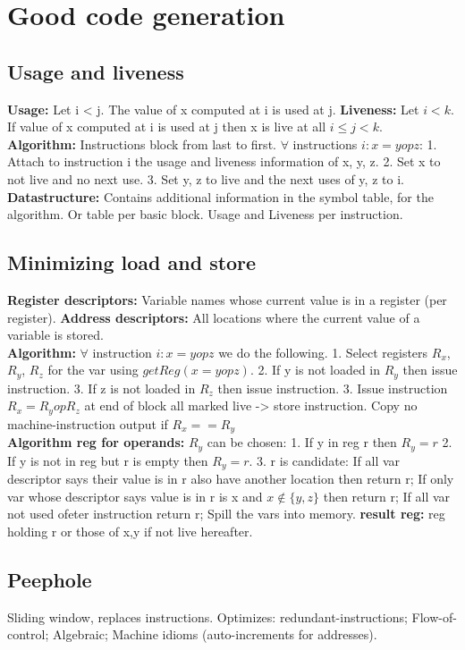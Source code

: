 \section{Good code generation}
\subsection*{Usage and liveness}
\textbf{Usage:} Let i < j. The value of x computed at i is used at j. \textbf{Liveness:} Let $i < k$. If value of x computed at i is used at j then x is live at all $i \leqslant j < k$.\\
\textbf{Algorithm:} Instructions block from last to first. $\forall$ instructions $i: x = y op z$: 1. Attach to instruction i the usage and liveness information of x, y, z. 2. Set x to not live and no next use. 3. Set y, z to live and the next uses of y, z to i.\\
\textbf{Datastructure:} Contains additional information in the symbol table, for the algorithm. Or table per basic block. Usage and Liveness per instruction.
\subsection*{Minimizing load and store}
\textbf{Register descriptors:} Variable names whose current value is in a register (per register). \textbf{Address descriptors:} All locations where the current value of a variable is stored.\\ 
\textbf{Algorithm:} $\forall$ instruction $i: x = y op z$ we do the following. 1. Select registers $R_x$, $R_y$, $R_z$ for the var using $getReg(x = y op z)$. 2. If y is not loaded in $R_y$ then issue instruction. 3. If z is not loaded in $R_z$ then issue instruction. 3. Issue instruction $R_x = R_y op R_z$ at end of block all marked live -> store instruction. Copy no machine-instruction output if $R_x == R_y$\\
\textbf{Algorithm reg for operands:} $R_y$ can be chosen: 1. If y in reg r then $R_y = r$ 2. If y is not in reg but r is empty then $R_y = r$. 3. r is candidate: If all var descriptor says their value is in r also have another location then return r; If only var whose descriptor says value is in r is x and $x \notin \{y,z\}$ then return r; If all var not used ofeter instruction return r; Spill the vars into memory. \textbf{result reg:} reg holding r or those of x,y if not live hereafter.
\subsection*{Peephole}
Sliding window, replaces instructions. Optimizes: redundant-instructions; Flow-of-control; Algebraic; Machine idioms (auto-increments for addresses).
